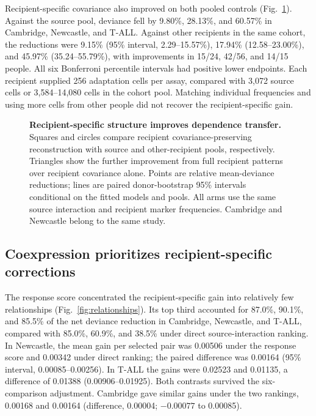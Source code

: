 \documentclass[pdflatex,sn-vancouver-num,iicol]{sn-jnl}
\begin{document}
Recipient-specific covariance also improved on both pooled controls
(Fig.~\ref{fig:resolution}). Against the source pool, deviance fell by
9.80\%, 28.13\%, and 60.57\% in Cambridge, Newcastle, and T-ALL. Against other
recipients in the same cohort, the reductions were 9.15\% (95\% interval,
2.29--15.57\%), 17.94\% (12.58--23.00\%), and 45.97\% (35.24--55.79\%),
with improvements in 15/24, 42/56, and 14/15 people. All six Bonferroni
percentile intervals had positive lower endpoints. Each recipient supplied
256 adaptation cells per assay, compared with 3,072 source cells or
3,584--14,080 cells in the cohort pool. Matching individual frequencies and
using more cells from other people did not recover the recipient-specific gain.

\begin{figure}[t]
\centering

\caption{\textbf{Recipient-specific structure improves dependence transfer.}
Squares and circles compare recipient covariance-preserving reconstruction
with source and other-recipient pools, respectively. Triangles show the further
improvement from full recipient patterns over recipient covariance alone.
Points are relative mean-deviance reductions; lines are paired donor-bootstrap
95\% intervals conditional on the fitted models and pools. All arms use the
same source interaction and recipient marker frequencies. Cambridge and
Newcastle belong to the same study.}
\label{fig:resolution}
\end{figure}

\subsection{Coexpression prioritizes recipient-specific corrections}
The response score concentrated the recipient-specific gain into relatively
few relationships (Fig.~\ref{fig:relationships}). Its top third accounted for
87.0\%, 90.1\%, and 85.5\% of the net deviance reduction in Cambridge,
Newcastle, and T-ALL, compared with 85.0\%, 60.9\%, and 38.5\% under direct
source-interaction ranking. In Newcastle, the mean gain per selected pair was
0.00506 under the response score and 0.00342 under direct ranking; the paired
difference was 0.00164 (95\% interval, 0.00085--0.00256). In T-ALL the gains
were 0.02523 and 0.01135, a difference of 0.01388 (0.00906--0.01925).
Both contrasts survived the six-comparison adjustment. Cambridge gave similar
gains under the two rankings, 0.00168 and 0.00164 (difference, 0.00004;
$-0.00077$ to 0.00085).
\end{document}
